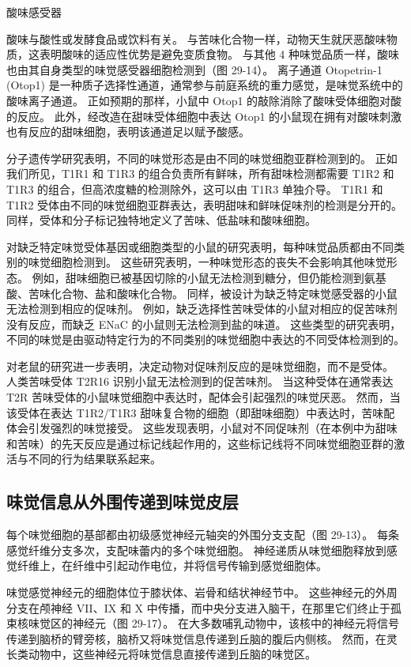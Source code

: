 酸味感受器

酸味与酸性或发酵食品或饮料有关。 与苦味化合物一样，动物天生就厌恶酸味物质，这表明酸味的适应性优势是避免变质食物。 与其他 4 种味觉品质一样，酸味也由其自身类型的味觉感受器细胞检测到（图 29-14）。 离子通道 Otopetrin-1 (Otop1) 是一种质子选择性通道，通常参与前庭系统的重力感觉，是味觉系统中的酸味离子通道。 正如预期的那样，小鼠中 Otop1 的敲除消除了酸味受体细胞对酸的反应。 此外，经改造在甜味受体细胞中表达 Otop1 的小鼠现在拥有对酸味刺激也有反应的甜味细胞，表明该通道足以赋予酸感。

分子遗传学研究表明，不同的味觉形态是由不同的味觉细胞亚群检测到的。 正如我们所见，T1R1 和 T1R3 的组合负责所有鲜味，所有甜味检测都需要 T1R2 和 T1R3 的组合，但高浓度糖的检测除外，这可以由 T1R3 单独介导。 T1R1 和 T1R2 受体由不同的味觉细胞亚群表达，表明甜味和鲜味促味剂的检测是分开的。 同样，受体和分子标记独特地定义了苦味、低盐味和酸味细胞。

对缺乏特定味觉受体基因或细胞类型的小鼠的研究表明，每种味觉品质都由不同类别的味觉细胞检测到。 这些研究表明，一种味觉形态的丧失不会影响其他味觉形态。 例如，甜味细胞已被基因切除的小鼠无法检测到糖分，但仍能检测到氨基酸、苦味化合物、盐和酸味化合物。 同样，被设计为缺乏特定味觉感受器的小鼠无法检测到相应的促味剂。 例如，缺乏选择性苦味受体的小鼠对相应的促苦味剂没有反应，而缺乏 ENaC 的小鼠则无法检测到盐的味道。 这些类型的研究表明，不同的味觉是由驱动特定行为的不同类别的味觉细胞中表达的不同受体检测到的。

对老鼠的研究进一步表明，决定动物对促味剂反应的是味觉细胞，而不是受体。 人类苦味受体 T2R16 识别小鼠无法检测到的促苦味剂。 当这种受体在通常表达 T2R 苦味受体的小鼠味觉细胞中表达时，配体会引起强烈的味觉厌恶。 然而，当该受体在表达 T1R2/T1R3 甜味复合物的细胞（即甜味细胞）中表达时，苦味配体会引发强烈的味觉接受。 这些发现表明，小鼠对不同促味剂（在本例中为甜味和苦味）的先天反应是通过标记线起作用的，这些标记线将不同味觉细胞亚群的激活与不同的行为结果联系起来。



\subsection{味觉信息从外围传递到味觉皮层}
每个味觉细胞的基部都由初级感觉神经元轴突的外围分支支配（图 29-13）。 每条感觉纤维分支多次，支配味蕾内的多个味觉细胞。 神经递质从味觉细胞释放到感觉纤维上，在纤维中引起动作电位，并将信号传输到感觉细胞体。

味觉感觉神经元的细胞体位于膝状体、岩骨和结状神经节中。 这些神经元的外周分支在颅神经 VII、IX 和 X 中传播，而中央分支进入脑干，在那里它们终止于孤束核味觉区的神经元（图 29-17）。 在大多数哺乳动物中，该核中的神经元将信号传递到脑桥的臂旁核，脑桥又将味觉信息传递到丘脑的腹后内侧核。 然而，在灵长类动物中，这些神经元将味觉信息直接传递到丘脑的味觉区。

